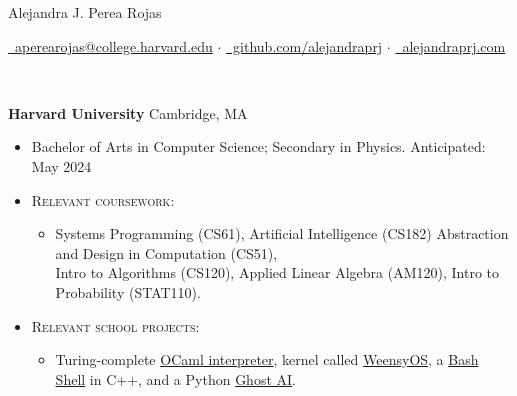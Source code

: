 \documentclass[11pt]{article}
\begin{document}
  \centerline{\Large{Alejandra J. Perea Rojas}}\vspace{1mm}

  \centerline{
    \href{mailto:aperearojas@college.harvard.edu}{\color{darkBlue}\faEnvelope~aperearojas@college.harvard.edu} 
    $\cdot$ \href{https://github.com/alejandraprj}{\color{darkBlue}\faGithub~github.com/alejandraprj}
    $\cdot$ \href{https://alejandraprj.com}{\color{darkBlue}\faGlobe~alejandraprj.com}
  }\vspace{2.5mm}

  \vspace{-8pt}\\
  \noindent\makebox[\linewidth]{\rule{7.5in}{0.3pt}}

  \noindent \textbf{Harvard University} \hfill Cambridge, MA
    \begin{itemize}[itemsep=-.4em, leftmargin=1em]\vspace{-2mm}
        \item Bachelor of Arts in Computer Science; Secondary in Physics. \hfill Anticipated: May 2024
        \item \textsc{Relevant coursework:} 
        \begin{itemize}[itemsep=-.5em, leftmargin=1em]\vspace{-3mm}
          \item Systems Programming (CS61), Artificial Intelligence (CS182)
                Abstraction and Design in Computation (CS51), \\
                Intro to Algorithms (CS120), 
                Applied Linear Algebra (AM120), 
                Intro to Probability (STAT110).
        \end{itemize}
        \item \textsc{Relevant school projects:} 
        \begin{itemize}[itemsep=-.4em, leftmargin=1em]\vspace{-3mm}
              \item Turing-complete \href{https://book.cs51.io/pdfs/abstraction-21-project.pdf}{OCaml interpreter},
              kernel called \href{https://cs61.seas.harvard.edu/site/2021/WeensyOS/}{WeensyOS},
              a \href{https://cs61.seas.harvard.edu/site/2021/Shell/}{Bash Shell} in C++, 
              and a Python \href{http://procaccia.info/courses/CS182-F22/pset3.pdf}{Ghost AI}.
        \end{itemize}
    \end{itemize}
  \vspace{.5mm}
\end{document}
